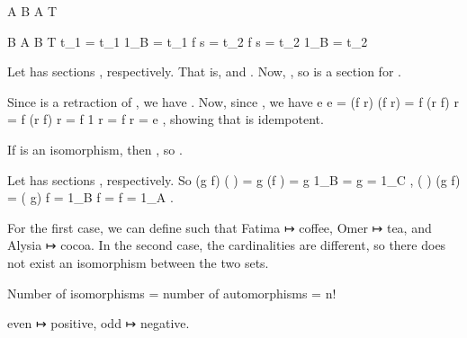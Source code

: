 	\startsection [title={Article II, Exercise 6}]
		\starttikzcd
			A
				\arrow[r, "f"]
			\NC  B
				\arrow[r, "r"]
			\NC  A
				\arrow[r, "g"]
			\NC  T
			\NR
		\stoptikzcd
	\stopsection

	\startsection [title={Article II, Exercise 7}]
		\starttikzcd
			B \arrow[r, "s"] 
			\NC  A \arrow[r, "f"]
			\NC  B  
			\NC  T
			\NR
		\stoptikzcd
		\startformula
			t_1 = t_1 1_B = t_1 f s = t_2 f s = t_2 1_B = t_2
		\stopformula
	\stopsection

	\startsection [title={Article II, Exercise 8}]
		Let  has sections , respectively. That is,  and . Now, , so  is a section for .
	\stopsection

	\startsection [title={Article II, Exercise 9}]
		Since  is a retraction of , we have . Now, since , we have
		\startformula
			e e  =  (f r) (f r)  =  f (r f) r  =  f (r f) r  =  f 1 r  =  f r  =  e ,
		\stopformula
		showing that  is idempotent.

		If  is an isomorphism, then , so .
	\stopsection

	\startsection [title={Article II, Exercise 10}]
		Let  has sections , respectively. So
		\startformula \startalign[align={left}]
			\NC  (g f) (	 )  =  g (f )	   =  g 1_B	 \inv{g}  =  g   =  1_C ,    \NR
			\NC  (	 ) (g f)  =  	 ( g) f  =  \inv{f} 1_B	 f  =   f  =  1_A .  \NR
		\stopalign \stopformula
	\stopsection

	\startsection [title={Article II, Exercise 11}]
		For the first case, we can define  such that Fatima ↦ coffee, Omer ↦ tea, and Alysia ↦ cocoa. In the second case, the cardinalities are different, so there does not exist an isomorphism between the two sets.
	\stopsection

	\startsection [title={Article II, Exercise 12}]
		Number of isomorphisms = number of automorphisms = n!
	\stopsection

	\startsection [title={Session 4, Exercise 2}]
		even ↦ positive, odd ↦	negative.
	\stopsection

